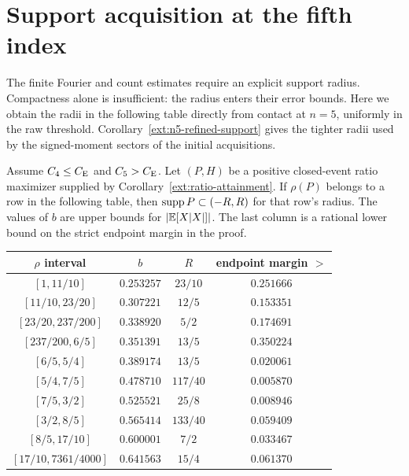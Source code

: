 \section{Support acquisition at the fifth index}\label{ext:n5-support}
The finite Fourier and count estimates require an explicit support radius.
Compactness alone is insufficient: the radius enters their error bounds.
Here we obtain the radii in the following table directly from contact at
$n=5$, uniformly in the raw threshold. Corollary~\ref{ext:n5-refined-support} gives the tighter radii used by the
signed-moment sectors of the initial acquisitions.

\begin{proposition}\label{ext:n5-support-table}
Assume $C_4\le C_{\mathrm E}$ and $C_5>C_{\mathrm E}$. Let $(P,H)$ be a positive
closed-event ratio maximizer supplied by Corollary~\ref{ext:ratio-attainment}.
If $\rho(P)$ belongs to a row in the following table, then
$\operatorname{supp} P\subset(-R,R)$ for that row's radius. The values of $b$
are upper bounds for $|\mathbb E[X|X|]|$. The last column is a rational
lower bound on the strict endpoint margin in the proof.
\begin{center}\small
\begin{tabular}{@{}cccc@{}}
\toprule
$\rho$ interval & $b$ & $R$ & endpoint margin $>$\\
\midrule
$[1,11/10]$ & $0.253257$ & $23/10$ & $0.251666$\\
$[11/10,23/20]$ & $0.307221$ & $12/5$ & $0.153351$\\
$[23/20,237/200]$ & $0.338920$ & $5/2$ & $0.174691$\\
$[237/200,6/5]$ & $0.351391$ & $13/5$ & $0.350224$\\
$[6/5,5/4]$ & $0.389174$ & $13/5$ & $0.020061$\\
$[5/4,7/5]$ & $0.478710$ & $117/40$ & $0.005870$\\
$[7/5,3/2]$ & $0.525521$ & $25/8$ & $0.008946$\\
$[3/2,8/5]$ & $0.565414$ & $133/40$ & $0.059409$\\
$[8/5,17/10]$ & $0.600001$ & $7/2$ & $0.033467$\\
$[17/10,7361/4000]$ & $0.641563$ & $15/4$ & $0.061370$\\
\bottomrule
\end{tabular}
\end{center}
\end{proposition}

